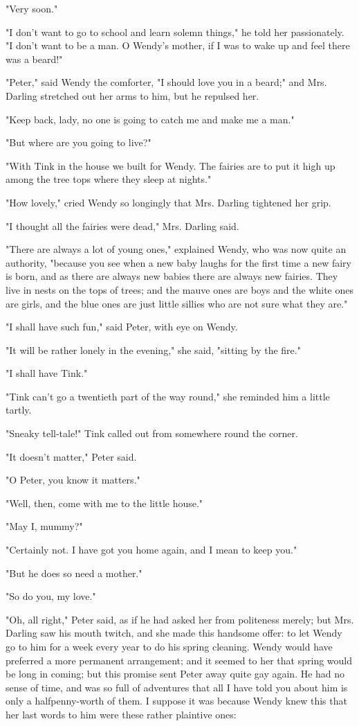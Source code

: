 "Very soon."


"I don't want to go to school and learn solemn things," he told her
passionately. "I don't want to be a man. O Wendy's mother, if I was to
wake up and feel there was a beard!"


"Peter," said Wendy the comforter, "I should love you in a beard;" and
Mrs. Darling stretched out her arms to him, but he repulsed her.


"Keep back, lady, no one is going to catch me and make me a man."


"But where are you going to live?"


"With Tink in the house we built for Wendy. The fairies are to put it high
up among the tree tops where they sleep at nights."


"How lovely," cried Wendy so longingly that Mrs. Darling tightened her
grip.


"I thought all the fairies were dead," Mrs. Darling said.


"There are always a lot of young ones," explained Wendy, who was now quite
an authority, "because you see when a new baby laughs for the first time a
new fairy is born, and as there are always new babies there are always new
fairies. They live in nests on the tops of trees; and the mauve ones are
boys and the white ones are girls, and the blue ones are just little
sillies who are not sure what they are."


"I shall have such fun," said Peter, with eye on Wendy.


"It will be rather lonely in the evening," she said, "sitting by the
fire."


"I shall have Tink."


"Tink can't go a twentieth part of the way round," she reminded him a
little tartly.


"Sneaky tell-tale!" Tink called out from somewhere round the corner.


"It doesn't matter," Peter said.


"O Peter, you know it matters."


"Well, then, come with me to the little house."


"May I, mummy?"


"Certainly not. I have got you home again, and I mean to keep you."


"But he does so need a mother."


"So do you, my love."


"Oh, all right," Peter said, as if he had asked her from politeness
merely; but Mrs. Darling saw his mouth twitch, and she made this handsome
offer: to let Wendy go to him for a week every year to do his spring
cleaning. Wendy would have preferred a more permanent arrangement; and it
seemed to her that spring would be long in coming; but this promise sent
Peter away quite gay again. He had no sense of time, and was so full of
adventures that all I have told you about him is only a halfpenny-worth of
them. I suppose it was because Wendy knew this that her last words to him
were these rather plaintive ones:


